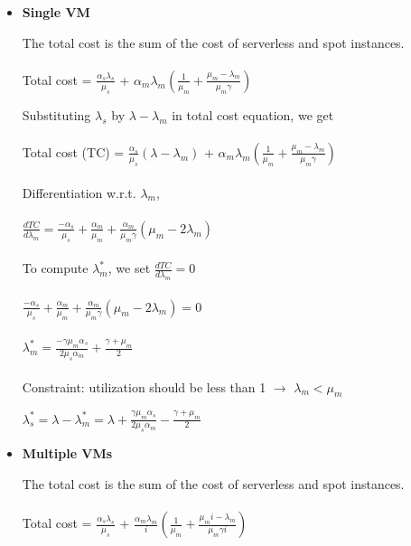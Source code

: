 \documentclass[letter,11pt]{article}
\begin{document}
\begin{itemize}
\item \textbf{Single VM}

The total cost is the sum of the cost of serverless and spot instances. \\ \\
Total cost = $\frac{\alpha_s \lambda_s}{\mu_s}$ + $\alpha_m \lambda_m(\frac{1}{\mu_m} + \frac{\mu_m - \lambda_m}{\mu_m \gamma}) $

Substituting $\lambda_s$ by $\lambda - \lambda_m$ in total cost equation, we get\\ \\
Total cost (TC) = $\frac{\alpha_s}{\mu_s}(\lambda - \lambda_m)$ + $\alpha_m \lambda_m(\frac{1}{\mu_m} + \frac{\mu_m - \lambda_m}{\mu_m \gamma}) $ \\ \\
Differentiation w.r.t. $\lambda_m$, \\ \\
$\frac{d TC}{d \lambda_m} = \frac{- \alpha_s}{\mu_s} + \frac{\alpha_m}{\mu_m} + \frac{\alpha_m}{\mu_m \gamma}(\mu_m - 2 \lambda_m)$ \\ \\
To compute $\lambda_m^{*}$, we set $\frac{d TC}{d \lambda_m} = 0$ \\ \\
$\frac{- \alpha_s}{\mu_s} + \frac{\alpha_m}{\mu_m} + \frac{\alpha_m}{\mu_m \gamma}(\mu_m - 2 \lambda_m) = 0$ \\ \\ 
$\lambda_m^{*} = \frac{- \gamma \mu_m \alpha_s}{2 \mu_s \alpha_m} + \frac{\gamma + \mu_m}{2}$ \\ \\
Constraint: utilization should be less than 1 $\rightarrow$ $\lambda_m < \mu_m$

$\lambda_s^{*} = \lambda - \lambda_m^{*} = \lambda + \frac{\gamma \mu_m \alpha_s}{2 \mu_s \alpha_m} - \frac{\gamma + \mu_m}{2}$

\item \textbf{Multiple VMs}

The total cost is the sum of the cost of serverless and spot instances. \\ \\
Total cost = $\frac{\alpha_s \lambda_s}{\mu_s}$ + $\frac{\alpha_m \lambda_m}{i} (\frac{1}{\mu_m} + \frac{\mu_m i - \lambda_m}{\mu_m \gamma i})$


\end{itemize}
\end{document}
